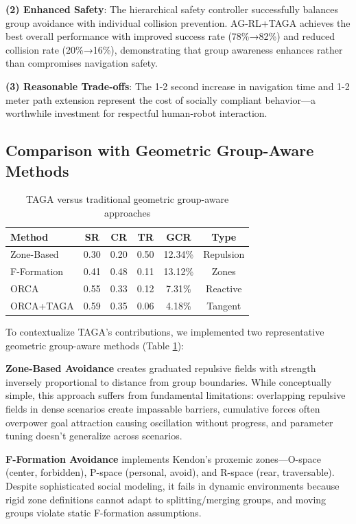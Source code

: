 \textbf{(2) Enhanced Safety}: The hierarchical safety controller successfully balances group avoidance with individual collision prevention. AG-RL+TAGA achieves the best overall performance with improved success rate (78\%→82\%) and reduced collision rate (20\%→16\%), demonstrating that group awareness enhances rather than compromises navigation safety.

\textbf{(3) Reasonable Trade-offs}: The 1-2 second increase in navigation time and 1-2 meter path extension represent the cost of socially compliant behavior—a worthwhile investment for respectful human-robot interaction.

\subsection{Comparison with Geometric Group-Aware Methods}
\begin{table}[t]
\caption{TAGA versus traditional geometric group-aware approaches}
\label{table:geometric}
\centering
\small
\setlength{\tabcolsep}{4pt}
\begin{tabular}{lccccc}
\hline
\textbf{Method} & \textbf{SR} & \textbf{CR} & \textbf{TR} & \textbf{GCR} & \textbf{Type} \\
\hline
Zone-Based & 0.30 & 0.20 & 0.50 & 12.34\% & Repulsion \\
F-Formation & 0.41 & 0.48 & 0.11 & 13.12\% & Zones \\
ORCA & 0.55 & 0.33 & 0.12 & 7.31\% & Reactive \\
ORCA+TAGA & 0.59 & 0.35 & 0.06 & 4.18\% & Tangent \\
\hline
\end{tabular}
\end{table}

To contextualize TAGA's contributions, we implemented two representative geometric group-aware methods (Table \ref{table:geometric}):

\textbf{Zone-Based Avoidance}  creates graduated repulsive fields with strength inversely proportional to distance from group boundaries. While conceptually simple, this approach suffers from fundamental limitations: overlapping repulsive fields in dense scenarios create impassable barriers, cumulative forces often overpower goal attraction causing oscillation without progress, and parameter tuning doesn't generalize across scenarios. 

\textbf{F-Formation Avoidance} implements Kendon's proxemic zones—O-space (center, forbidden), P-space (personal, avoid), and R-space (rear, traversable). Despite sophisticated social modeling, it fails in dynamic environments because rigid zone definitions cannot adapt to splitting/merging groups, and moving groups violate static F-formation assumptions.

